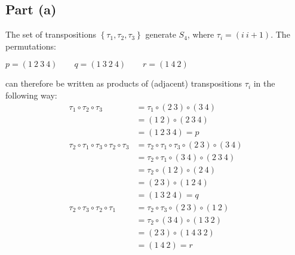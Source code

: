 \documentclass{article}
\begin{document}
\subsection*{Part (a)}
The set of transpositions $\left\{\tau_1,\tau_2,\tau_3\right\}$ generate $S_4$, where $\tau_i = \left(i~ i+1\right)$. The permutations:
\begin{center}
    $p = \left(1~2~3~4\right)
    \qquad
    q = \left(1~3~2~4\right)
    \qquad
    r = \left(1~4~2\right)
    $
\end{center}
can therefore be written as products of (adjacent) transpositions $\tau_i$ in the following way:
\begin{equation}
    \begin{split}
        \tau_1 \circ \tau_2 \circ \tau_3 & = \tau_1 \circ \left(2~3\right) \circ \left(3~4\right) \\
        & = \left(1~2\right) \circ \left(2~3~4\right) \\
        & = \left(1~2~3~4\right) = p \\
        \tau_2 \circ \tau_1 \circ \tau_3 \circ \tau_2 \circ \tau_3 & = \tau_2 \circ \tau_1 \circ \tau_3 \circ \left(2~3\right) \circ \left(3~4\right) \\
        & = \tau_2 \circ \tau_1 \circ \left(3~4\right) \circ \left(2~3~4\right) \\
        & = \tau_2 \circ \left(1~2\right) \circ \left(2~4\right) \\
        & = \left(2~3\right) \circ \left(1~2~4\right) \\
        & = \left(1~3~2~4\right) = q \\
        \tau_2 \circ \tau_3 \circ \tau_2 \circ \tau_1 & = \tau_2 \circ \tau_3 \circ \left(2~3\right) \circ \left(1~2\right) \\
        & = \tau_2 \circ \left(3~4\right) \circ \left(1~3~2\right) \\
        & = \left(2~3\right) \circ \left(1~4~3~2\right) \\
        & = \left(1~4~2\right) = r
    \end{split}
\end{equation} 
\end{document}
